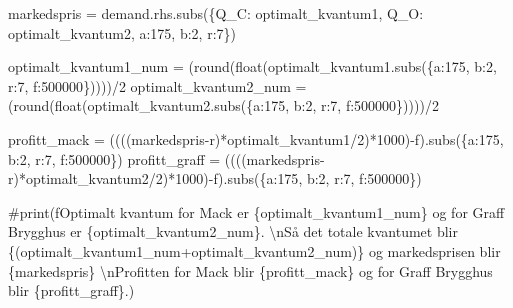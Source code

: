 \documentclass[
  12pt,
  a4paper,
  DIV=11,
  numbers=noendperiod]{scrartcl}
\newenvironment{Shaded}{\begin{snugshade}}{\end{snugshade}}
\newcommand{\BuiltInTok}[1]{\textcolor[rgb]{0.00,0.23,0.31}{#1}}
\newcommand{\CommentTok}[1]{\textcolor[rgb]{0.37,0.37,0.37}{#1}}
\newcommand{\DecValTok}[1]{\textcolor[rgb]{0.68,0.00,0.00}{#1}}
\newcommand{\NormalTok}[1]{\textcolor[rgb]{0.00,0.23,0.31}{#1}}
\newcommand{\OperatorTok}[1]{\textcolor[rgb]{0.37,0.37,0.37}{#1}}
\begin{document}
\begin{Shaded}
\begin{Highlighting}[]
\NormalTok{markedspris }\OperatorTok{=}\NormalTok{ demand.rhs.subs(\{Q\_C: optimalt\_kvantum1, Q\_O: optimalt\_kvantum2, a:}\DecValTok{175}\NormalTok{, b:}\DecValTok{2}\NormalTok{, r:}\DecValTok{7}\NormalTok{\})}

\NormalTok{optimalt\_kvantum1\_num }\OperatorTok{=}\NormalTok{ (}\BuiltInTok{round}\NormalTok{(}\BuiltInTok{float}\NormalTok{(optimalt\_kvantum1.subs(\{a:}\DecValTok{175}\NormalTok{, b:}\DecValTok{2}\NormalTok{, r:}\DecValTok{7}\NormalTok{, f:}\DecValTok{500000}\NormalTok{\}))))}\OperatorTok{/}\DecValTok{2}
\NormalTok{optimalt\_kvantum2\_num }\OperatorTok{=}\NormalTok{ (}\BuiltInTok{round}\NormalTok{(}\BuiltInTok{float}\NormalTok{(optimalt\_kvantum2.subs(\{a:}\DecValTok{175}\NormalTok{, b:}\DecValTok{2}\NormalTok{, r:}\DecValTok{7}\NormalTok{, f:}\DecValTok{500000}\NormalTok{\}))))}\OperatorTok{/}\DecValTok{2}

\NormalTok{profitt\_mack }\OperatorTok{=}\NormalTok{ ((((markedspris}\OperatorTok{{-}}\NormalTok{r)}\OperatorTok{*}\NormalTok{optimalt\_kvantum1}\OperatorTok{/}\DecValTok{2}\NormalTok{)}\OperatorTok{*}\DecValTok{1000}\NormalTok{)}\OperatorTok{{-}}\NormalTok{f).subs(\{a:}\DecValTok{175}\NormalTok{, b:}\DecValTok{2}\NormalTok{, r:}\DecValTok{7}\NormalTok{, f:}\DecValTok{500000}\NormalTok{\})}
\NormalTok{profitt\_graff }\OperatorTok{=}\NormalTok{ ((((markedspris}\OperatorTok{{-}}\NormalTok{r)}\OperatorTok{*}\NormalTok{optimalt\_kvantum2}\OperatorTok{/}\DecValTok{2}\NormalTok{)}\OperatorTok{*}\DecValTok{1000}\NormalTok{)}\OperatorTok{{-}}\NormalTok{f).subs(\{a:}\DecValTok{175}\NormalTok{, b:}\DecValTok{2}\NormalTok{, r:}\DecValTok{7}\NormalTok{, f:}\DecValTok{500000}\NormalTok{\})}

\CommentTok{\#print(f\textquotesingle{}\textquotesingle{}\textquotesingle{}Optimalt kvantum for Mack er \{optimalt\_kvantum1\_num\} og for Graff Brygghus er \{optimalt\_kvantum2\_num\}. \textbackslash{}nSå det totale kvantumet blir \{(optimalt\_kvantum1\_num+optimalt\_kvantum2\_num)\} og markedsprisen blir \{markedspris\} \textbackslash{}nProfitten for Mack blir \{profitt\_mack\} og for Graff Brygghus blir \{profitt\_graff\}.\textquotesingle{}\textquotesingle{}\textquotesingle{})}



\end{Highlighting}
\end{Shaded}
\end{document}
